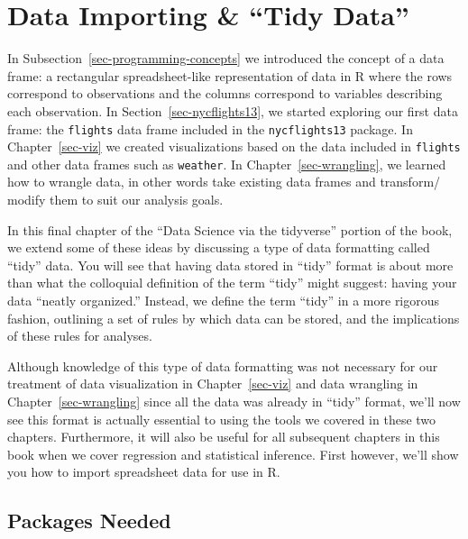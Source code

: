 \documentclass[
  letterpaper,
  DIV=11,
  numbers=noendperiod]{scrreprt}
\theoremstyle{definition}
\theoremstyle{remark}
\begin{document}
\hypertarget{sec-tidy}{%
\chapter{Data Importing \& ``Tidy Data''}\label{sec-tidy}}

In Subsection~\ref{sec-programming-concepts} we introduced the concept
of a data frame: a rectangular spreadsheet-like representation of data
in R where the rows correspond to observations and the columns
correspond to variables describing each observation. In
Section~\ref{sec-nycflights13}, we started exploring our first data
frame: the \texttt{flights} data frame included in the
\texttt{nycflights13} package. In Chapter~\ref{sec-viz} we created
visualizations based on the data included in \texttt{flights} and other
data frames such as \texttt{weather}. In Chapter~\ref{sec-wrangling}, we
learned how to wrangle data, in other words take existing data frames
and transform/ modify them to suit our analysis goals.

In this final chapter of the ``Data Science via the tidyverse'' portion
of the book, we extend some of these ideas by discussing a type of data
formatting called ``tidy'' data. You will see that having data stored in
``tidy'' format is about more than what the colloquial definition of the
term ``tidy'' might suggest: having your data ``neatly organized.''
Instead, we define the term ``tidy'' in a more rigorous fashion,
outlining a set of rules by which data can be stored, and the
implications of these rules for analyses.

Although knowledge of this type of data formatting was not necessary for
our treatment of data visualization in Chapter~\ref{sec-viz} and data
wrangling in Chapter~\ref{sec-wrangling} since all the data was already
in ``tidy'' format, we'll now see this format is actually essential to
using the tools we covered in these two chapters. Furthermore, it will
also be useful for all subsequent chapters in this book when we cover
regression and statistical inference. First however, we'll show you how
to import spreadsheet data for use in R.

\hypertarget{packages-needed-2}{%
\section*{Packages Needed}\label{packages-needed-2}}

\end{document}
